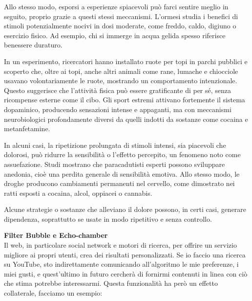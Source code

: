 \documentclass[12pt]{book} %
\begin{document}
\begin{mdframed}[linewidth=1pt]
Allo stesso modo, esporsi a esperienze spiacevoli può farci sentire meglio in seguito, proprio grazie a questi stessi meccanismi. L’ormesi studia i benefici di stimoli potenzialmente nocivi in dosi moderate, come freddo, caldo, digiuno o esercizio fisico. Ad esempio, chi si immerge in acqua gelida spesso riferisce benessere duraturo.

In un esperimento, ricercatori hanno installato ruote per topi in parchi pubblici e scoperto che, oltre ai topi, anche altri animali come rane, lumache e chiocciole usavano volontariamente le ruote, mostrando un comportamento intenzionale. Questo suggerisce che l’attività fisica può essere gratificante di per sé, senza ricompense esterne come il cibo. Gli sport estremi attivano fortemente il sistema dopaminico, producendo sensazioni intense e appaganti, ma con meccanismi neurobiologici profondamente diversi da quelli indotti da sostanze come cocaina e metanfetamine.

In alcuni casi, la ripetizione prolungata di stimoli intensi, sia piacevoli che dolorosi, può ridurre la sensibilità o l’effetto percepito, un fenomeno noto come assuefazione. Studi mostrano che paracadutisti esperti possono sviluppare anedonia, cioè una perdita generale di sensibilità emotiva. Allo stesso modo, le droghe producono cambiamenti permanenti nel cervello, come dimostrato nei ratti esposti a cocaina, alcol, oppiacei o cannabis.

Alcune strategie o sostanze che alleviano il dolore possono, in certi casi, generare dipendenza, soprattutto se usate in modo ripetitivo e senza controllo.
\end{mdframed}

\noindent \textbf{\large Filter Bubble e Echo-chamber} \\
Il web, in particolare social network e motori di ricerca, per offrire un servizio migliore ai propri utenti, crea dei
risultati personalizzati. Se io faccio una ricerca su YouTube, sto indirettamente comunicando
all'algoritmo le mie preferenze, i miei gusti, e quest'ultimo in futuro
cercherà di fornirmi contenuti in linea con ciò che stima potrebbe interessarmi. Questa funzionalità ha però un effetto
collaterale, facciamo un esempio:
\end{document}
